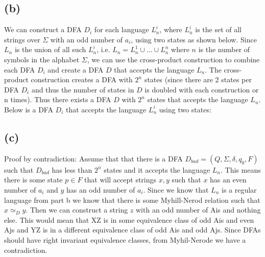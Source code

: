 \documentclass[12pt]{article}
\begin{document}
\subsection*{(b)}
  We can construct a DFA $D_i$ for each language $L^i_n$, where $L^i_n$ is the
  set of all strings over $\Sigma$ with an odd number of $a_i$, using two states
  as shown below. Since $L_n$ is the union of all such $L^i_n$, i.e.
  $L_n = L^1_n \cup \dots \cup L^n_n$ where $n$ is the number of symbols in the
  alphabet $\Sigma$, we can use the cross-product construction to combine each
  DFA $D_i$ and create a DFA $D$ that accepts the language $L_n$.
  The cross-product construction creates a DFA with $2^n$ states (since there
  are 2 states per DFA $D_i$ and thus the number of states in $D$ is doubled
  with each construction or n times). Thus there exists a DFA $D$ with $2^n$
  states that accepts the language $L_n$.
  \vspace{0.5cm}
  Below is a DFA $D_i$ that accepts the language $L^i_n$ using two states:
  \newline
  \begin{center}
  \end{center}

\subsection*{(c)}
Proof by contradiction:\newline
\indent Assume that that there is a DFA $D_{bad} = (Q, \Sigma, \delta, q_0, F)$ such that $D_{bad}$ has less than $2^n$ states and it accepts the language $L_n$.  This means there is some state $p \in F$ that will accept strings $x, y$ such that $x$ has an even number of $a_i$ and $y$ has an odd number of $a_i$.  Since we know that $L_n$ is a regular language from part b we know that there is some Myhill-Nerod relation such that $x \simeq_D y$. Then we can construct a string $z$ with an odd number of Ais and nothing else.  This would mean that XZ is in some equivalence class of odd Ais and even Ajs and YZ is in a different equivalence class of odd Ais and odd Ajs.  Since DFAs should have right invariant equivalence classes, from Myhil-Nerode we have a contradiction.
\end{document}
